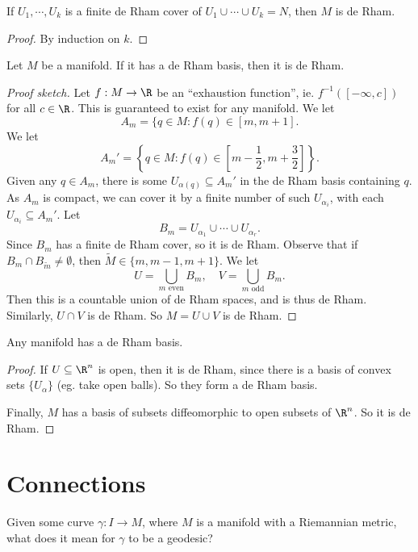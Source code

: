 \documentclass[a4paper]{article}
\begin{document}
\begin{cor}
  If $U_1,\cdots, U_k$ is a finite de Rham cover of $U_1 \cup \cdots \cup U_k = N$, then $M$ is de Rham.
\end{cor}

\begin{proof}
  By induction on $k$.
\end{proof}

\begin{lemma}
  Let $M$ be a manifold. If it has a de Rham basis, then it is de Rham.
\end{lemma}

\begin{proof}[Proof sketch]
  Let $f: M \to \R$ be an ``exhaustion function'', ie. $f^{-1}([-\infty, c])$ for all $c \in \R$. This is guaranteed to exist for any manifold. We let
  \[
    A_m = \{q \in M: f(q) \in [m, m + 1].
  \]
  We let
  \[
    A_m' = \left\{q \in M: f(q) \in \left[m - \frac{1}{2}, m + \frac{3}{2}\right]\right\}.
  \]
  Given any $q \in A_m$, there is some $U_{\alpha(q)} \subseteq A_m'$ in the de Rham basis containing $q$. As $A_m$ is compact, we can cover it by a finite number of such $U_{\alpha_i}$, with each $U_{\alpha_i} \subseteq A_m'$. Let
  \[
    B_m = U_{\alpha_1} \cup \cdots \cup U_{\alpha_r}.
  \]
  Since $B_m$ has a finite de Rham cover, so it is de Rham. Observe that if $B_m \cap B_{\tilde{m}} \not= \emptyset$, then $\tilde{M} \in \{m, m - 1, m + 1\}$. We let
  \[
    U = \bigcup_{m\text{ even}} B_m,\quad V = \bigcup_{m \text{ odd}} B_m.
  \]
  Then this is a countable union of de Rham spaces, and is thus de Rham. Similarly, $U \cap V$ is de Rham. So $M = U \cup V$ is de Rham.
\end{proof}

\begin{thm}
  Any manifold has a de Rham basis.
\end{thm}

\begin{proof}
  If $U \subseteq \R^n$ is open, then it is de Rham, since there is a basis of convex sets $\{U_\alpha\}$ (eg. take open balls). So they form a de Rham basis.

  Finally, $M$ has a basis of subsets diffeomorphic to open subsets of $\R^n$. So it is de Rham.
\end{proof}

\section{Connections}
Given some curve $\gamma: I \to M$, where $M$ is a manifold with a Riemannian metric, what does it mean for $\gamma$ to be a geodesic?
\end{document}
